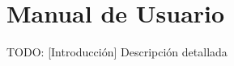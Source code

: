 \chapter{Manual de Usuario\label{extra:manual_de_usuario}}

TODO: [Introducción]
  {Descripción detallada}